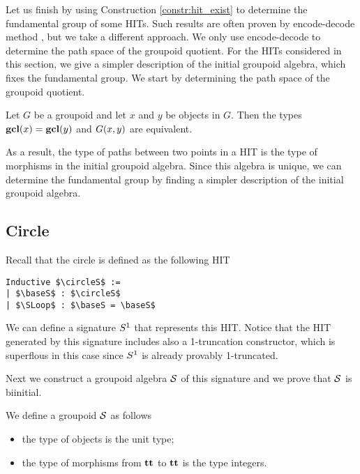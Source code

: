 Let us finish by using Construction \ref{constr:hit_exist} to determine the fundamental group of some HITs.
Such results are often proven by encode-decode method \cite{LicataS13,LicataF14}, but we take a different approach.
We only use encode-decode to determine the path space of the groupoid quotient.
For the HITs considered in this section, we give a simpler description of the initial groupoid algebra, which fixes the fundamental group.
We start by determining the path space of the groupoid quotient.

\begin{proposition}
\label{prop:groupoid_quot_encode_decode}
Let $G$ be a groupoid and let $x$ and $y$ be objects in $G$.
Then the types $\operatorname{\mathbf{gcl}}(x) = \operatorname{\mathbf{gcl}}(y)$ and $G(x, y)$ are equivalent.
\end{proposition}

As a result, the type of paths between two points in a HIT is the type of morphisms in the initial groupoid algebra.
Since this algebra is unique, we can determine the fundamental group by finding a simpler description of the initial groupoid algebra.

\subsection{Circle}
\label{sec:circle_fund_group}
Recall that the circle is defined as the following HIT

\begin{lstlisting}[mathescape=true]
Inductive $\circleS$ :=
| $\baseS$ : $\circleS$
| $\SLoop$ : $\baseS = \baseS$
\end{lstlisting}

We can define a signature $S^1$ that represents this HIT. Notice that the HIT generated by this signature includes also
a 1-truncation constructor, which is superflous in this case since $S^1$ is already provably
1-truncated.

Next we construct a groupoid algebra $\mathcal{S}$ of this signature and we prove that $\mathcal{S}$ is biinitial.

\begin{definition}
We define a groupoid $\mathcal{S}$ as follows
\begin{itemize}
	\item the type of objects is the unit type;
	\item the type of morphisms from $\operatorname{\mathbf{tt}}$ to $\operatorname{\mathbf{tt}}$ is the type integers.
\end{itemize}
\end{definition}

